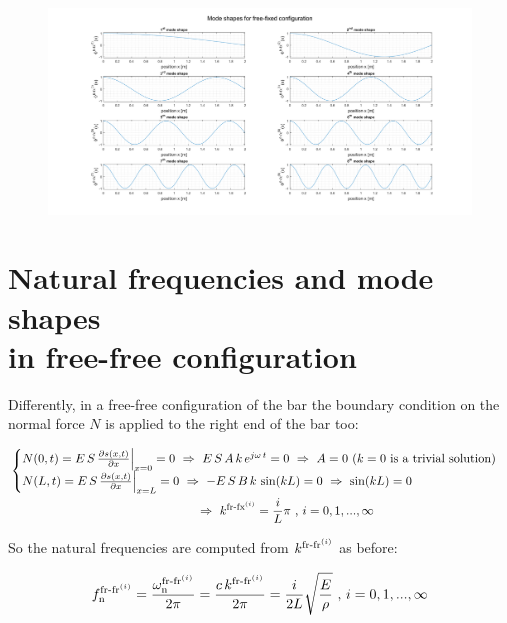\documentclass[a4paper,12pt,oneside]{article}
\begin{document}
\begin{figure}[h]
	\hspace{-70pt}
	\includegraphics[scale=0.4]{mode_shapes_free_fixed}
\end{figure}


\section{Natural frequencies and mode shapes \\ in free-free configuration}

Differently, in a free-free configuration of the bar the boundary condition on the normal force $ N $ is applied to the right end of the bar too:

\[ \begin{split}
	& \begin{cases}
			N(0,t) = E \, S \, \frac{\partial s(x,t)}{\partial x} \Big|_{x=0} = 0 %
				~ \Rightarrow ~ E \, S \, A \, k \, e^{j \omega \, t} = 0 %
				~ \Rightarrow ~ A = 0 ~ \text{($ k = 0 $ is a trivial solution)} \\
			N(L,t) = E \, S \, \frac{\partial s(x,t)}{\partial x} \Big|_{x=L} = 0 %
				~ \Rightarrow ~ - E \, S \, B \, k \, \sin(kL) = 0 ~ \Rightarrow ~ \sin(kL) = 0
	\end{cases}	\\
	& \hspace{150pt}~ \Rightarrow ~ %
		k^{\textup{fr-fx}^{(i)}} = \frac{i}{L} \pi ~ \text{,} ~ i = 0,1,...,\infty
\end{split} \]

So the natural frequencies are computed from $ k^{\textup{fr-fr}^{(i)}} $ as before:

\[
	f_\textup{n}^{\textup{fr-fr}^{(i)}} = %
		\frac{\omega_\textup{n}^{\textup{fr-fr}^{(i)}}}{2 \pi} = %
		\frac{c \, k^{\textup{fr-fr}^{(i)}}}{2 \pi} = %
		\frac{i}{2L} \sqrt{\frac{E}{\rho}} ~ \text{,} ~ i = 0,1,...,\infty
\]
\end{document}
